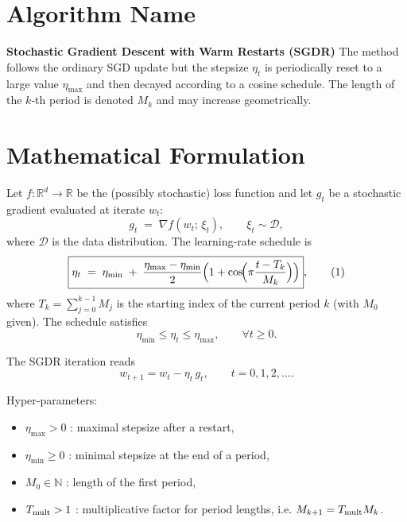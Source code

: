 \documentclass{article}
\begin{document}
\section*{Algorithm Name}
\textbf{Stochastic Gradient Descent with Warm Restarts (SGDR)}  
The method follows the ordinary SGD update but the stepsize $\eta_t$ is
periodically reset to a large value $\eta_{\max}$ and then decayed
according to a cosine schedule.  The length of the $k$‑th period is denoted
$M_k$ and may increase geometrically.

\section*{Mathematical Formulation}
Let $f:\mathbb{R}^d\rightarrow\mathbb{R}$ be the (possibly stochastic) loss
function and let $g_t$ be a stochastic gradient evaluated at iterate $w_t$:
\[
g_t \;=\; \nabla f(w_t;\,\xi_t),\qquad \xi_t\sim\mathcal{D},
\]
where $\mathcal{D}$ is the data distribution.  
The learning‑rate schedule is
\[
\boxed{
\eta_t \;=\; \eta_{\min}
          \;+\; \frac{\eta_{\max}-\eta_{\min}}{2}
                \Bigl(1+\cos\!\Bigl(\pi\frac{t-T_k}{M_k}\Bigr)\Bigr)},
\tag{1}
\]
where $T_k=\sum_{j=0}^{k-1}M_j$ is the starting index of the current
period $k$ (with $M_0$ given).  The schedule satisfies
\[
\eta_{\min}\le \eta_t\le\eta_{\max},\qquad\forall t\ge0 .
\]

The SGDR iteration reads
\[
\boxed{w_{t+1}=w_t-\eta_t\,g_t},\qquad t=0,1,2,\dots .
\tag{2}
\]

Hyper‑parameters:
\begin{itemize}
  \item $\eta_{\max}>0$ : maximal stepsize after a restart,
  \item $\eta_{\min}\ge0$ : minimal stepsize at the end of a period,
  \item $M_0\in\mathbb{N}$ : length of the first period,
  \item $T_{\rm mult}>1$ : multiplicative factor for period lengths,
        i.e. $M_{k+1}=T_{\rm mult}M_k$.
\end{itemize}

\end{document}
